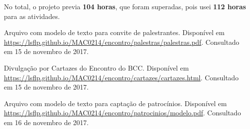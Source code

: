 \documentclass[12pt,letterpaper]{article}
\begin{document}
	No total, o projeto previa \textbf{104 horas}, que foram superadas, pois usei \textbf{112 horas} para as atividades.
	
	
	
	\begin{thebibliography}{1}
		
		Arquivo com modelo de texto para convite de palestrantes.
		\newblock Disponível em \url{https://lsflp.github.io/MAC0214/encontro/palestras/palestras.pdf}.
		\newblock Consultado em 15 de novembro de 2017.
		
		Divulgação por Cartazes do Encontro do BCC.
		\newblock Disponível em \url{https://lsflp.github.io/MAC0214/encontro/cartazes/cartazes.html}.
		\newblock Consultado em 15 de novembro de 2017.
		
		Arquivo com modelo de texto para captação de patrocínios.
		\newblock Disponível em \url{https://lsflp.github.io/MAC0214/encontro/patrocinios/modelo.pdf}.
		\newblock Consultado em 16 de novembro de 2017.
		
	\end{thebibliography}
	
			 
\end{document}
